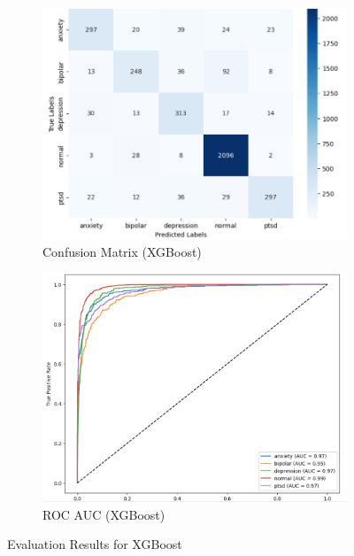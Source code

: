 \vspace{0.25em}

\begin{figure}[h!]
    \centering
    \begin{subfigure}[b]{0.49\textwidth}
        \centering
        \includegraphics[width=\textwidth]{Images/XG Confusion Matrix.png}
        \caption{Confusion Matrix (XGBoost)}
        \label{XGCM}  %
    \end{subfigure}
    \hfill
    \begin{subfigure}[b]{0.49\textwidth}
        \centering
        \includegraphics[width=\textwidth]{Images/XG ROC.png}
        \caption{ROC AUC (XGBoost)}
        \label{XGROC}  %
    \end{subfigure}
    \caption{Evaluation Results for XGBoost}
    \label{fig:xgboost_comparison}
\end{figure}

